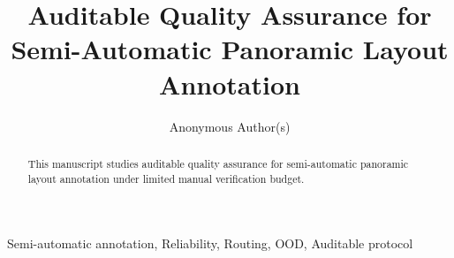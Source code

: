 \documentclass[journal,onecolumn]{IEEEtran}
\title{Auditable Quality Assurance for Semi-Automatic Panoramic Layout Annotation}
\author{Anonymous Author(s)}
\date{}
\begin{document}
\maketitle

\begin{abstract}
This manuscript studies auditable quality assurance for semi-automatic panoramic layout annotation under limited manual verification budget.
\end{abstract}

\begin{IEEEkeywords}
Semi-automatic annotation, Reliability, Routing, OOD, Auditable protocol
\end{IEEEkeywords}












\end{document}
